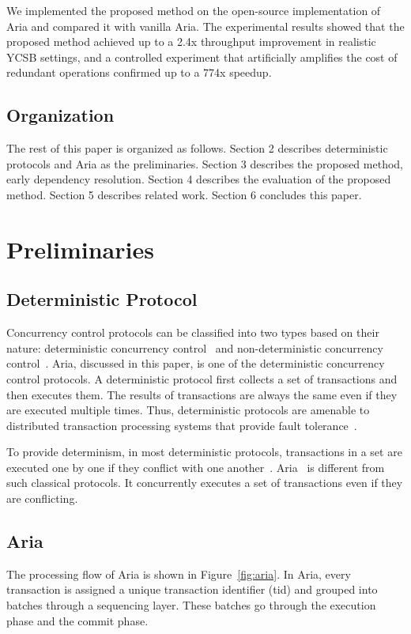 \documentclass[english,preprint,JIP]{ipsj}
\begin{document}
We implemented the proposed method on the open-source implementation of Aria and compared it with vanilla Aria. 
The experimental results showed that the proposed method achieved up to a 2.4x throughput improvement in realistic YCSB settings, and a controlled experiment that artificially amplifies the cost of redundant operations confirmed up to a 774x speedup.

\subsection{Organization}
The rest of this paper is organized as follows.
Section 2 describes deterministic protocols and Aria as the preliminaries.
Section 3 describes the proposed method, early dependency resolution.
Section 4 describes the evaluation of the proposed method.
Section 5 describes related work.
Section 6 concludes this paper.

\section{Preliminaries}
\subsection{Deterministic Protocol}
Concurrency control protocols can be classified into two types based on their nature: deterministic concurrency control~\cite{calvin, faleiro17, qin2021caracal, thomson2010case} and non-deterministic concurrency control~\cite{yu2016tictoc,tu2013speedy,nakamori2022decentralization}. 
%
Aria, discussed in this paper, is one of the deterministic concurrency control protocols. 
A deterministic protocol first collects a set of transactions and then executes them. The results of transactions are always the same even if they are executed multiple times. Thus, deterministic protocols are amenable to distributed transaction processing systems that provide fault tolerance~\cite{calvin}. 

To provide determinism, in most deterministic protocols, transactions in a set are executed one by one if they conflict with one another~\cite{thomson2010case,calvin,qin2021caracal,faleiro17}.
Aria~\cite{lu2020aria} is different from such classical protocols. It concurrently executes a set of transactions even if they are conflicting. 

\subsection{Aria}
The processing flow of Aria is shown in Figure~\ref{fig:aria}. 
In Aria, every transaction is assigned a unique transaction identifier (tid) and grouped into batches through a sequencing layer. These batches go through the execution phase and the commit phase. 
\end{document}
